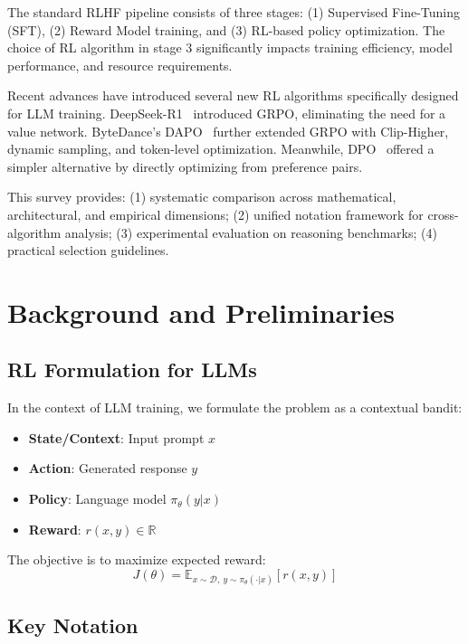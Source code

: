 \documentclass[10pt,twocolumn]{article}
\begin{document}
The standard RLHF pipeline consists of three stages: (1) Supervised Fine-Tuning (SFT), (2) Reward Model training, and (3) RL-based policy optimization. The choice of RL algorithm in stage 3 significantly impacts training efficiency, model performance, and resource requirements.

Recent advances have introduced several new RL algorithms specifically designed for LLM training. DeepSeek-R1~\cite{deepseek2025r1} introduced GRPO, eliminating the need for a value network. ByteDance's DAPO~\cite{yu2025dapo} further extended GRPO with Clip-Higher, dynamic sampling, and token-level optimization. Meanwhile, DPO~\cite{rafailov2023dpo} offered a simpler alternative by directly optimizing from preference pairs.

This survey provides: (1) systematic comparison across mathematical, architectural, and empirical dimensions; (2) unified notation framework for cross-algorithm analysis; (3) experimental evaluation on reasoning benchmarks; (4) practical selection guidelines.

\section{Background and Preliminaries}
\label{sec:bg}

\subsection{RL Formulation for LLMs}

In the context of LLM training, we formulate the problem as a contextual bandit:
\begin{itemize}[leftmargin=*, itemsep=0pt]
\item \textbf{State/Context}: Input prompt $x$
\item \textbf{Action}: Generated response $y$
\item \textbf{Policy}: Language model $\pi_\theta(y|x)$
\item \textbf{Reward}: $r(x, y) \in \mathbb{R}$
\end{itemize}

The objective is to maximize expected reward:
\begin{equation}
J(\theta) = \mathbb{E}_{x \sim \mathcal{D},\ y \sim \pi_\theta(\cdot|x)}\left[r(x, y)\right]
\label{eq:obj}
\end{equation}

\subsection{Key Notation}
\end{document}
